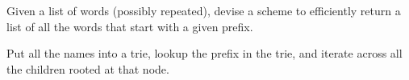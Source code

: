 \question Given a list of words (possibly repeated), devise a scheme to efficiently return a list of all the words that start with a given prefix.

\begin{solution}[0.75in]
Put all the names into a trie, lookup the prefix in the trie, and iterate across all the children rooted at that node.
\end{solution}